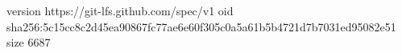version https://git-lfs.github.com/spec/v1
oid sha256:5c15cc8c2d45ea90867fc77ae6e60f305c0a5a61b5b4721d7b7031ed95082e51
size 6687
